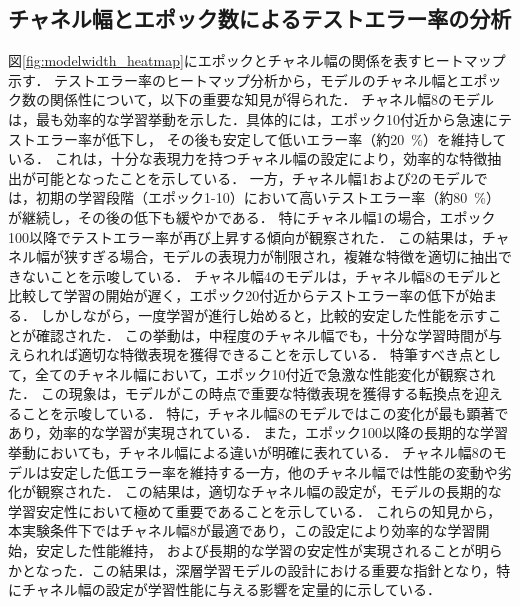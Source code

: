 \subsection{チャネル幅とエポック数によるテストエラー率の分析}
図\ref{fig:modelwidth_heatmap}にエポックとチャネル幅の関係を表すヒートマップ示す．
テストエラー率のヒートマップ分析から，モデルのチャネル幅とエポック数の関係性について，以下の重要な知見が得られた．
チャネル幅8のモデルは，最も効率的な学習挙動を示した．具体的には，エポック10付近から急速にテストエラー率が低下し，
その後も安定して低いエラー率（約\SI{20}{\percent}）を維持している．
これは，十分な表現力を持つチャネル幅の設定により，効率的な特徴抽出が可能となったことを示している．
一方，チャネル幅1および2のモデルでは，初期の学習段階（エポック1-10）において高いテストエラー率（約\SI{80}{\percent}）が継続し，その後の低下も緩やかである．
特にチャネル幅1の場合，エポック100以降でテストエラー率が再び上昇する傾向が観察された．
この結果は，チャネル幅が狭すぎる場合，モデルの表現力が制限され，複雑な特徴を適切に抽出できないことを示唆している．
チャネル幅4のモデルは，チャネル幅8のモデルと比較して学習の開始が遅く，エポック20付近からテストエラー率の低下が始まる．
しかしながら，一度学習が進行し始めると，比較的安定した性能を示すことが確認された．
この挙動は，中程度のチャネル幅でも，十分な学習時間が与えられれば適切な特徴表現を獲得できることを示している．
特筆すべき点として，全てのチャネル幅において，エポック10付近で急激な性能変化が観察された．
この現象は，モデルがこの時点で重要な特徴表現を獲得する転換点を迎えることを示唆している．
特に，チャネル幅8のモデルではこの変化が最も顕著であり，効率的な学習が実現されている．
また，エポック100以降の長期的な学習挙動においても，チャネル幅による違いが明確に表れている．
チャネル幅8のモデルは安定した低エラー率を維持する一方，他のチャネル幅では性能の変動や劣化が観察された．
この結果は，適切なチャネル幅の設定が，モデルの長期的な学習安定性において極めて重要であることを示している．
これらの知見から，本実験条件下ではチャネル幅8が最適であり，この設定により効率的な学習開始，安定した性能維持，
および長期的な学習の安定性が実現されることが明らかとなった．この結果は，深層学習モデルの設計における重要な指針となり，特にチャネル幅の設定が学習性能に与える影響を定量的に示している．

